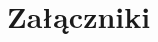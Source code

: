 \documentclass[licencjacka]{pracamgr}
\begin{document}
\begin{thebibliography}{99}













\end{thebibliography}

\chapter*{Załączniki}
\end{document}
